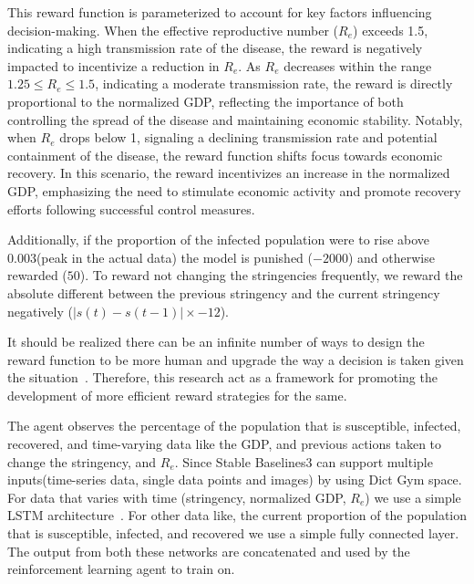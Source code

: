 \documentclass[tikz,fleqn,12pt]{wlscirep}
\begin{document}
This reward function is parameterized to account for key factors influencing decision-making. When the effective reproductive number ($R_e$) exceeds 1.5, indicating a high transmission rate of the disease, the reward is negatively impacted to incentivize a reduction in $R_e$. As $R_e$ decreases within the range $1.25 \leq R_e \leq 1.5$, indicating a moderate transmission rate, the reward is directly proportional to the normalized GDP, reflecting the importance of both controlling the spread of the disease and maintaining economic stability. Notably, when $R_e$ drops below 1, signaling a declining transmission rate and potential containment of the disease, the reward function shifts focus towards economic recovery. In this scenario, the reward incentivizes an increase in the normalized GDP, emphasizing the need to stimulate economic activity and promote recovery efforts following successful control measures.

Additionally, if the proportion of the infected population were to rise above 0.003(peak in the actual data) the model is punished ($-2000$) and otherwise rewarded ($50$). To reward not changing the stringencies frequently, we reward the absolute different between the previous stringency and the current stringency negatively ($|s(t) - s(t-1)| \times -12$).

It should be realized there can be an infinite number of ways to design the reward function to be more human and upgrade the way a decision is taken given the situation~\cite{AWSDeepRacer}. Therefore, this research act as a  framework for promoting the development of more efficient reward strategies for the same. 

The agent observes the percentage of the population that is susceptible, infected, recovered, and time-varying data like the GDP, and previous actions taken to change the stringency, and $R_e$. Since Stable Baselines3 can support multiple inputs(time-series data, single data points and images) by using Dict Gym space. For data that varies with time (stringency, normalized GDP, $R_e$) we use a simple LSTM architecture~\cite{LSTM}. For other data like, the current proportion of the population that is susceptible, infected, and recovered we use a simple fully connected layer. The output from both these networks are concatenated and used by the reinforcement learning agent to train on.
\end{document}
